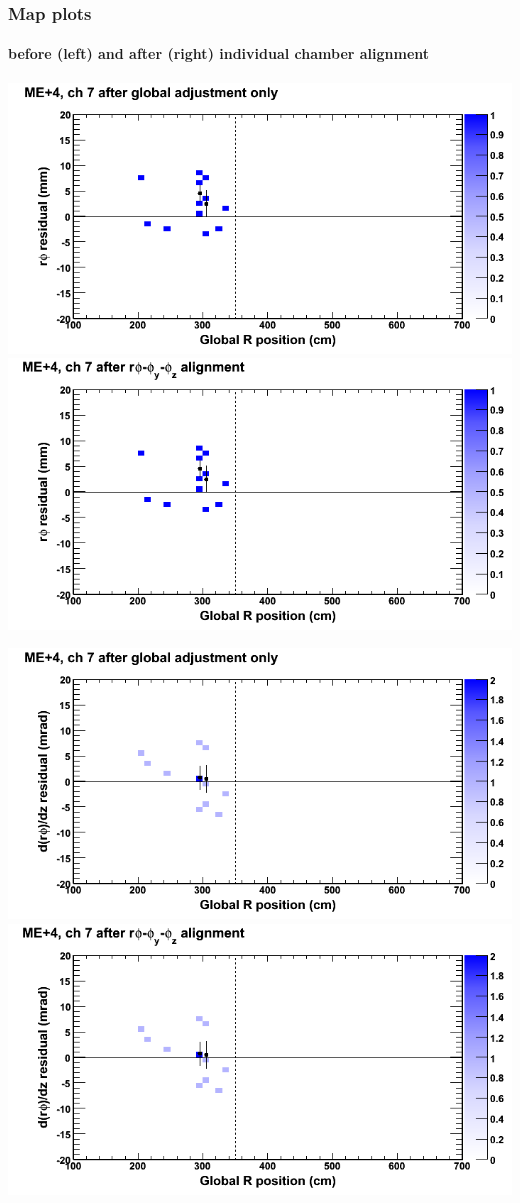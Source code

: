 \documentclass[compress]{beamer}
\begin{document}
\begin{frame}
\frametitle{Map plots}
\framesubtitle{before (left) and after (right) individual chamber alignment}
\includegraphics[width=0.5\linewidth]{ringmapplots_3dof/before_CSCvsr_mep4ch07_x.png} \includegraphics[width=0.5\linewidth]{ringmapplots_3dof/after_CSCvsr_mep4ch07_x.png}

\includegraphics[width=0.5\linewidth]{ringmapplots_3dof/before_CSCvsr_mep4ch07_dxdz.png} \includegraphics[width=0.5\linewidth]{ringmapplots_3dof/after_CSCvsr_mep4ch07_dxdz.png}
\end{frame}
\end{document}

